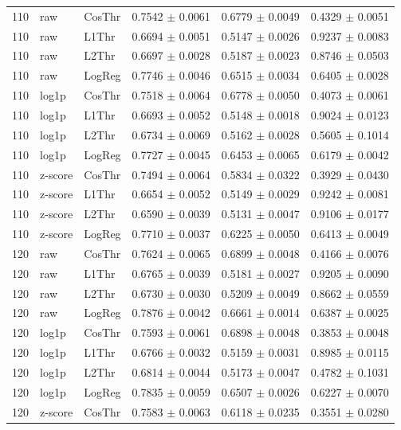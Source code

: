 \begin{longtable}{rllccc}
110 & raw & CosThr & 0.7542 $\pm$ 0.0061 & 0.6779 $\pm$ 0.0049 & 0.4329 $\pm$ 0.0051 \\
110 & raw & L1Thr & 0.6694 $\pm$ 0.0051 & 0.5147 $\pm$ 0.0026 & 0.9237 $\pm$ 0.0083 \\
110 & raw & L2Thr & 0.6697 $\pm$ 0.0028 & 0.5187 $\pm$ 0.0023 & 0.8746 $\pm$ 0.0503 \\
110 & raw & LogReg & 0.7746 $\pm$ 0.0046 & 0.6515 $\pm$ 0.0034 & 0.6405 $\pm$ 0.0028 \\
110 & log1p & CosThr & 0.7518 $\pm$ 0.0064 & 0.6778 $\pm$ 0.0050 & 0.4073 $\pm$ 0.0061 \\
110 & log1p & L1Thr & 0.6693 $\pm$ 0.0052 & 0.5148 $\pm$ 0.0018 & 0.9024 $\pm$ 0.0123 \\
110 & log1p & L2Thr & 0.6734 $\pm$ 0.0069 & 0.5162 $\pm$ 0.0028 & 0.5605 $\pm$ 0.1014 \\
110 & log1p & LogReg & 0.7727 $\pm$ 0.0045 & 0.6453 $\pm$ 0.0065 & 0.6179 $\pm$ 0.0042 \\
110 & z-score & CosThr & 0.7494 $\pm$ 0.0064 & 0.5834 $\pm$ 0.0322 & 0.3929 $\pm$ 0.0430 \\
110 & z-score & L1Thr & 0.6654 $\pm$ 0.0052 & 0.5149 $\pm$ 0.0029 & 0.9242 $\pm$ 0.0081 \\
110 & z-score & L2Thr & 0.6590 $\pm$ 0.0039 & 0.5131 $\pm$ 0.0047 & 0.9106 $\pm$ 0.0177 \\
110 & z-score & LogReg & 0.7710 $\pm$ 0.0037 & 0.6225 $\pm$ 0.0050 & 0.6413 $\pm$ 0.0049 \\
120 & raw & CosThr & 0.7624 $\pm$ 0.0065 & 0.6899 $\pm$ 0.0048 & 0.4166 $\pm$ 0.0076 \\
120 & raw & L1Thr & 0.6765 $\pm$ 0.0039 & 0.5181 $\pm$ 0.0027 & 0.9205 $\pm$ 0.0090 \\
120 & raw & L2Thr & 0.6730 $\pm$ 0.0030 & 0.5209 $\pm$ 0.0049 & 0.8662 $\pm$ 0.0559 \\
120 & raw & LogReg & 0.7876 $\pm$ 0.0042 & 0.6661 $\pm$ 0.0014 & 0.6387 $\pm$ 0.0025 \\
120 & log1p & CosThr & 0.7593 $\pm$ 0.0061 & 0.6898 $\pm$ 0.0048 & 0.3853 $\pm$ 0.0048 \\
120 & log1p & L1Thr & 0.6766 $\pm$ 0.0032 & 0.5159 $\pm$ 0.0031 & 0.8985 $\pm$ 0.0115 \\
120 & log1p & L2Thr & 0.6814 $\pm$ 0.0044 & 0.5173 $\pm$ 0.0047 & 0.4782 $\pm$ 0.1031 \\
120 & log1p & LogReg & 0.7835 $\pm$ 0.0059 & 0.6507 $\pm$ 0.0026 & 0.6227 $\pm$ 0.0070 \\
120 & z-score & CosThr & 0.7583 $\pm$ 0.0063 & 0.6118 $\pm$ 0.0235 & 0.3551 $\pm$ 0.0280 \\

\end{longtable}
